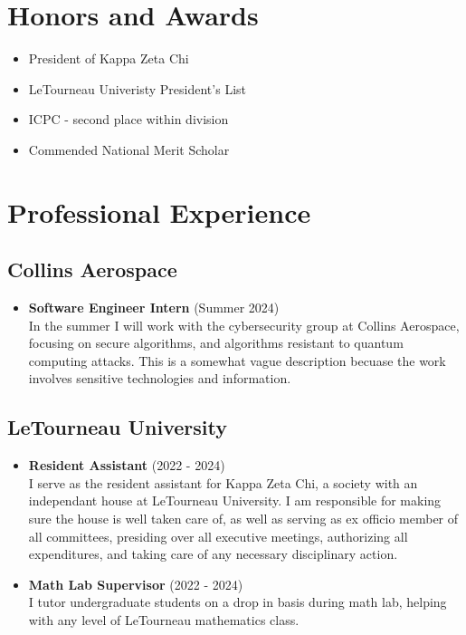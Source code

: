 \documentclass[a4paper, 11pt]{article}
\begin{document}
    \section*{Honors and Awards}\label{sec:awards}
    \begin{itemize}
        \item President of Kappa Zeta Chi
        \item LeTourneau Univeristy President's List
        \item ICPC - second place within division
        \item Commended National Merit Scholar
    \end{itemize}    
    
    \section*{Professional Experience}\label{sec:professional_experience}
    \subsection*{Collins Aerospace}
    \begin{itemize}
        \item \textbf{Software Engineer Intern} (Summer 2024) \\
        In the summer I will work with the cybersecurity group at Collins Aerospace,
        focusing on secure algorithms, and algorithms resistant to quantum computing attacks.
        This is a somewhat vague description becuase the work involves sensitive technologies and information.
    \end{itemize}
    \subsection*{LeTourneau University}
    \begin{itemize}
        \item \textbf{Resident Assistant} (2022 - 2024) \\
        I serve as the resident assistant for Kappa Zeta Chi, a society with an independant house at LeTourneau University.
        I am responsible for making sure the house is well taken care of,
        as well as serving as ex officio member of all committees, presiding over all executive meetings, authorizing all expenditures,
        and taking care of any necessary disciplinary action.
        \item \textbf{Math Lab Supervisor} (2022 - 2024)\\
        I tutor undergraduate students on a drop in basis during math lab, helping with any level of LeTourneau mathematics class.
    \end{itemize}
\end{document}
